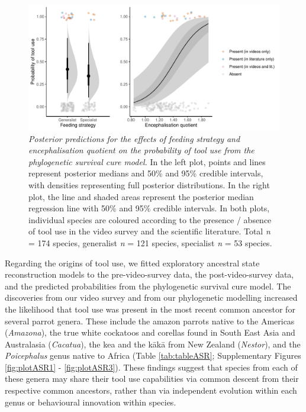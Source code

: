 \documentclass[
  man,floatsintext]{apa6}
\begin{document}
\begin{figure}
\centering
\includegraphics{manuscript_files/figure-latex/plotSurvCure4-1.pdf}
\caption{\label{fig:plotSurvCure4}\emph{Posterior predictions for the effects of feeding
strategy and encephalisation quotient on the probability of tool use from the
phylogenetic survival cure model.} In the left plot, points and lines represent
posterior medians and 50\% and 95\% credible intervals, with densities
representing full posterior distributions. In the right plot, the line and
shaded areas represent the posterior median regression line with 50\% and 95\%
credible intervals. In both plots, individual species are coloured according to
the presence / absence of tool use in the video survey and the scientific
literature. Total \emph{n} = 174 species, generalist \emph{n} =
121 species, specialist \emph{n} =
53 species.}
\end{figure}

Regarding the origins of tool use, we fitted exploratory ancestral state
reconstruction models to the pre-video-survey data, the post-video-survey data,
and the predicted probabilities from the phylogenetic survival cure model. The
discoveries from our video survey and from our phylogenetic modelling increased
the likelihood that tool use was present in the most recent common ancestor for
several parrot genera. These include the amazon parrots native to the Americas
(\emph{Amazona}), the true white cockatoos and corellas found in South East Asia and
Australasia (\emph{Cacatua}), the kea and the kākā from New Zealand (\emph{Nestor}), and
the \emph{Poicephalus} genus native to Africa (Table \ref{tab:tableASR};
Supplementary Figures \ref{fig:plotASR1} - \ref{fig:plotASR3}). These findings
suggest that species from each of these genera may share their tool use
capabilities via common descent from their respective common ancestors, rather
than via independent evolution within each genus or behavioural innovation
within species.
\end{document}

